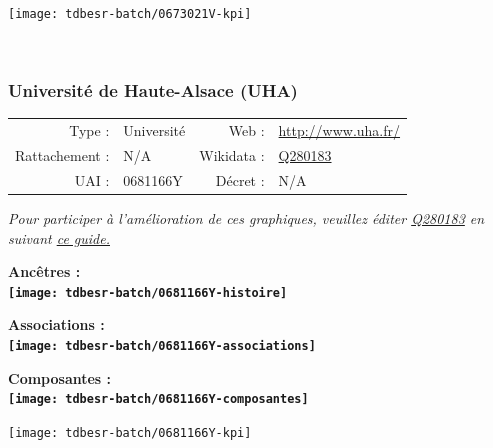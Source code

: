 \documentclass[12pt,french,]{article}
\begin{document}
\begin{center}\texttt{[image: tdbesr-batch/0673021V-kpi]} \end{center}\checkoddpage

\ifoddpage ~\newpage \fi   

\hypertarget{universituxe9-de-haute-alsace-uha}{%
\subsubsection{Université de Haute-Alsace
(UHA)}\label{universituxe9-de-haute-alsace-uha}}

\begin{tabular*}{\textwidth}{rp{5cm}rl}  
\hline  
Type : & Université & Web : &\href{http://www.uha.fr/}{http://www.uha.fr/} \\  
Rattachement : & N/A & Wikidata : & \href{https://www.wikidata.org/entity/Q280183}{Q280183} \\  
UAI : & 0681166Y & Décret : & N/A \\  
\hline  
\end{tabular*}

\textit{\scriptsize Pour participer à l'amélioration de ces graphiques, veuillez éditer  \href{https://www.wikidata.org/entity/Q280183}{Q280183}  en suivant \href{https://github.com/cpesr/wikidataESR/blob/master/Rmd/wikidataESR.md}{ce guide.}}

\vspace{1cm}  
\begin{minipage}[b]{0.50\textwidth}\begin{center} \bf Ancêtres : \\  
\texttt{[image: tdbesr-batch/0681166Y-histoire]} \end{center}\end{minipage}\begin{minipage}[b]{0.50\textwidth}\begin{center} \bf Associations : \\  
\texttt{[image: tdbesr-batch/0681166Y-associations]} \end{center}\end{minipage}

\hrulefill

\begin{center} \bf Composantes : \\  
\texttt{[image: tdbesr-batch/0681166Y-composantes]} \end{center}

\begin{center}\texttt{[image: tdbesr-batch/0681166Y-kpi]} \end{center}\checkoddpage
\end{document}
